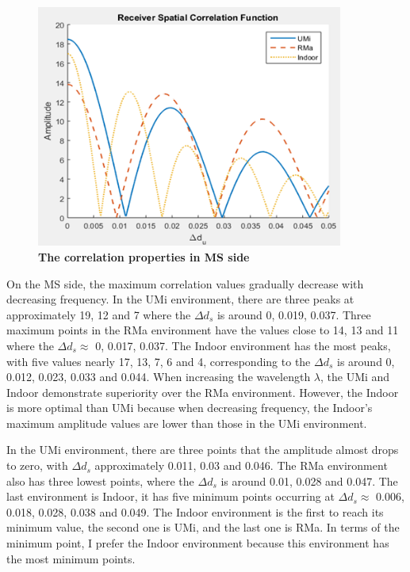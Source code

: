 \documentclass{article} %
\begin{document}
\begin{figure}[!ht]
    \centering
    \includegraphics[height=8cm]{Images/figure3.png}
    \caption[The correlation properties in MS side~\cite{final_exam}]{\bfseries \fontsize{12pt}{0pt}\selectfont The correlation properties in MS side~\cite{final_exam}}
    \label{figure3}
\end{figure}

On the MS side, the maximum correlation values gradually decrease with decreasing frequency. In the UMi environment, there are three peaks at approximately 19, 12 and 7 where the $\Delta d_s$ is around 0, 0.019, 0.037. Three maximum points in the RMa environment have the values close to 14, 13 and 11 where the $\Delta d_s \approx$ 0, 0.017, 0.037. The Indoor environment has the most peaks, with five values nearly 17, 13, 7, 6 and 4, corresponding to the $\Delta d_s$ is around 0, 0.012, 0.023, 0.033 and 0.044. When increasing the wavelength $\lambda$, the UMi and Indoor demonstrate superiority over the RMa environment. However, the Indoor is more optimal than UMi because when decreasing frequency, the Indoor’s maximum amplitude values are lower than those in the UMi environment.

In the UMi environment, there are three points that the amplitude almost drops to zero, with $\Delta d_s$ approximately 0.011, 0.03 and 0.046. The RMa environment also has three lowest points, where the $\Delta d_s$ is around 0.01, 0.028 and 0.047. The last environment is Indoor, it has five minimum points occurring at $\Delta d_s \approx$ 0.006, 0.018, 0.028, 0.038 and 0.049. The Indoor environment is the first to reach its minimum value, the second one is UMi, and the last one is RMa. In terms of the minimum point, I prefer the Indoor environment because this environment has the most minimum points.
\end{document}
